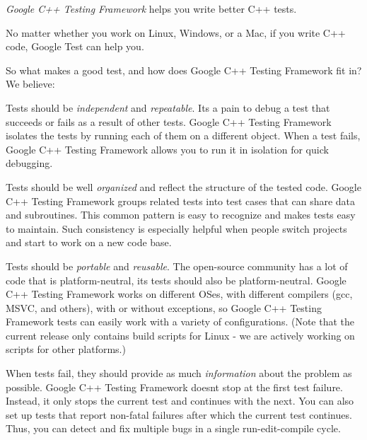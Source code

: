 {\itshape Google C++ Testing Framework} helps you write better C++ tests.

No matter whether you work on Linux, Windows, or a Mac, if you write C++ code, Google Test can help you.

So what makes a good test, and how does Google C++ Testing Framework fit in? We believe\+:
\begin{DoxyEnumerate}
\item Tests should be {\itshape independent} and {\itshape repeatable}. It\textquotesingle{}s a pain to debug a test that succeeds or fails as a result of other tests. Google C++ Testing Framework isolates the tests by running each of them on a different object. When a test fails, Google C++ Testing Framework allows you to run it in isolation for quick debugging.
\end{DoxyEnumerate}
\begin{DoxyEnumerate}
\item Tests should be well {\itshape organized} and reflect the structure of the tested code. Google C++ Testing Framework groups related tests into test cases that can share data and subroutines. This common pattern is easy to recognize and makes tests easy to maintain. Such consistency is especially helpful when people switch projects and start to work on a new code base.
\end{DoxyEnumerate}
\begin{DoxyEnumerate}
\item Tests should be {\itshape portable} and {\itshape reusable}. The open-\/source community has a lot of code that is platform-\/neutral, its tests should also be platform-\/neutral. Google C++ Testing Framework works on different O\+Ses, with different compilers (gcc, M\+S\+VC, and others), with or without exceptions, so Google C++ Testing Framework tests can easily work with a variety of configurations. (Note that the current release only contains build scripts for Linux -\/ we are actively working on scripts for other platforms.)
\end{DoxyEnumerate}
\begin{DoxyEnumerate}
\item When tests fail, they should provide as much {\itshape information} about the problem as possible. Google C++ Testing Framework doesn\textquotesingle{}t stop at the first test failure. Instead, it only stops the current test and continues with the next. You can also set up tests that report non-\/fatal failures after which the current test continues. Thus, you can detect and fix multiple bugs in a single run-\/edit-\/compile cycle.
\end{DoxyEnumerate}
